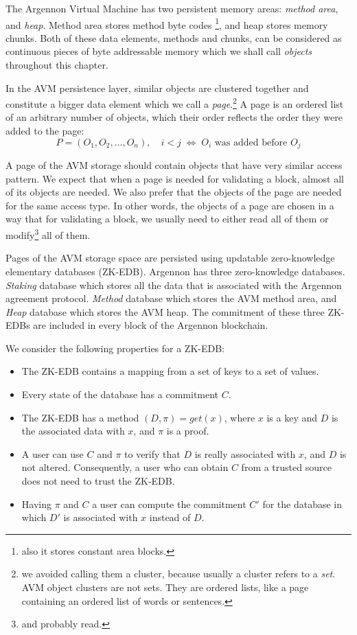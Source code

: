 

The Argennon Virtual Machine has two persistent memory areas: \emph{method area}, and \emph{heap}. Method area stores
method byte codes \footnote{also it stores constant area blocks.}, and heap stores memory chunks. Both of these
data elements, methods and chunks, can be considered as continuous pieces of byte addressable memory
which we shall call \emph{objects} throughout this chapter.

In the AVM persistence layer, similar objects are clustered together and constitute a bigger data element which we call a
\emph{page}.\footnote{we avoided calling them a cluster, because usually a cluster refers to a \emph{set}. AVM object
clusters are not sets. They are ordered lists, like a page containing an ordered list of words or sentences.}
A page is an ordered list of an arbitrary number of objects, which their order reflects the order they were added to
the page:
\[
    P = (O_1,O_2,\dots,O_n),\quad i < j \; \Leftrightarrow \; \textrm{$O_i$ was added before $O_j$}
\]

A page of the AVM storage should contain objects that have very similar access pattern. We expect that when a page
is needed for validating a block, almost all of its objects are needed. We also prefer that the objects of the page
are needed for the same access type. In other words, the objects of a page are chosen in a way that
for validating a block, we usually need to either read all of them or modify\footnote{and probably read.} all of them.

Pages of the AVM storage space are persisted using updatable zero-knowledge elementary databases (ZK-EDB). Argennon
has three zero-knowledge databases. \emph{Staking} database which stores all the data that is associated with
the Argennon agreement protocol. \emph{Method} database which stores the AVM method area, and \emph{Heap} database which
stores the AVM heap. The commitment of these three ZK-EDBs are included in every block of the Argennon blockchain.

We consider the following properties for a ZK-EDB:
\begin{itemize}
    \item The ZK-EDB contains a mapping from a set of keys to a set of values.
    \item Every state of the database has a commitment \(C\).
    \item The ZK-EDB has a method \((D, \pi) = get(x)\), where \(x\) is a key and \(D\) is the associated data
    with \(x\), and \(\pi\) is a proof.
    \item A user can use \(C\) and \(\pi\) to verify that \(D\) is really associated with \(x\), and \(D\) is not
    altered. Consequently, a user who can obtain \(C\) from a trusted source does not need to trust the ZK-EDB\@.
    \item Having \(\pi\) and \(C\) a user can compute the commitment \(C'\) for the database in which \(D'\) is
    associated with \(x\) instead of \(D\).
\end{itemize}

